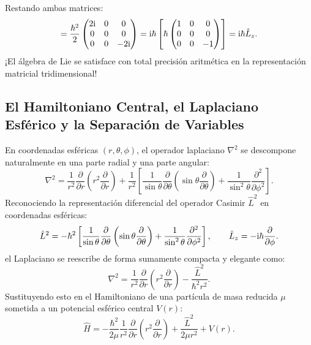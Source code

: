 \begin{alertabox}
    Restando ambas matrices:
    \begin{equation}
        [\hat{L}_x, \hat{L}_y] = \frac{\hbar^2}{2}\begin{pmatrix} 2\iu & 0 & 0 \\ 0 & 0 & 0 \\ 0 & 0 & -2\iu \end{pmatrix} = \iu\hbar\left[ \hbar\begin{pmatrix} 1 & 0 & 0 \\ 0 & 0 & 0 \\ 0 & 0 & -1 \end{pmatrix} \right] = \iu\hbar\hat{L}_z.
    \end{equation}
    ¡El álgebra de Lie se satisface con total precisión aritmética en la representación matricial tridimensional!
\end{alertabox}

\subsection{El Hamiltoniano Central, el Laplaciano Esférico y la Separación de Variables}
\label{subsec:hamiltoniano_central_laplaciano}

En coordenadas esféricas $(r, \theta, \phi)$, el operador laplaciano $\nabla^2$ se descompone naturalmente en una parte radial y una parte angular:
\begin{equation}
    \nabla^2 = \frac{1}{r^2}\frac{\partial}{\partial r}\left(r^2\frac{\partial}{\partial r}\right) + \frac{1}{r^2}\left[ \frac{1}{\sin\theta}\frac{\partial}{\partial\theta}\left(\sin\theta\frac{\partial}{\partial\theta}\right) + \frac{1}{\sin^2\theta}\frac{\partial^2}{\partial\phi^2} \right].
    \label{eq:laplaciano_esferico}
\end{equation}
Reconociendo la representación diferencial del operador Casimir $\hat{L}^2$ en coordenadas esféricas:
\begin{equation}
    \hat{L}^2 = -\hbar^2\left[ \frac{1}{\sin\theta}\frac{\partial}{\partial\theta}\left(\sin\theta\frac{\partial}{\partial\theta}\right) + \frac{1}{\sin^2\theta}\frac{\partial^2}{\partial\phi^2} \right], \qquad \hat{L}_z = -\mathrm{i}\hbar\frac{\partial}{\partial\phi}.
\end{equation}
el Laplaciano se reescribe de forma sumamente compacta y elegante como:
\begin{equation}
    \boxed{\nabla^2 = \frac{1}{r^2}\frac{\partial}{\partial r}\left(r^2\frac{\partial}{\partial r}\right) - \frac{\hat{L}^2}{\hbar^2 r^2}}.
    \label{eq:laplaciano_con_L2}
\end{equation}
Sustituyendo esto en el Hamiltoniano de una partícula de masa reducida $\mu$ sometida a un potencial esférico central $V(r)$:
\begin{equation}
    \boxed{\hat{H} = -\frac{\hbar^2}{2\mu}\frac{1}{r^2}\frac{\partial}{\partial r}\left(r^2\frac{\partial}{\partial r}\right) + \frac{\hat{L}^2}{2\mu r^2} + V(r)}.
    \label{eq:hamiltoniano_central_expandido}
\end{equation}

